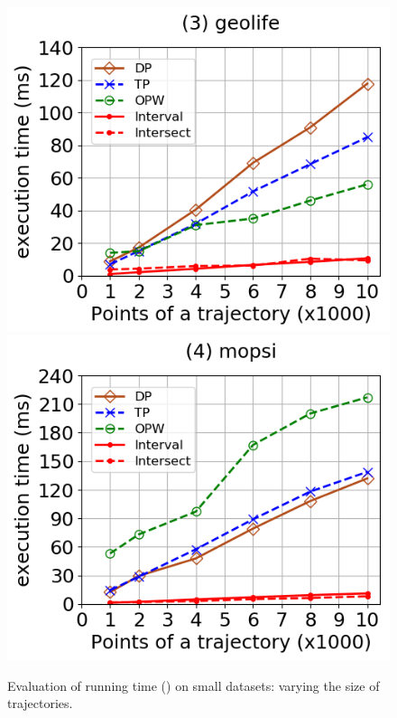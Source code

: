 \begin{figure}[tb!]
	\includegraphics[scale=0.315]{Figures/Exp-DAD-time-size-geolife.png}	\hspace{1ex}
	\includegraphics[scale=0.315]{Figures/Exp-DAD-time-size-mopsi.png}		
	\vspace{-3ex}
	\caption{\small Evaluation of running time (\dad) on small datasets: varying the size of trajectories.}\label{fig:time-size-dad}
	\vspace{-2ex}
\end{figure}



